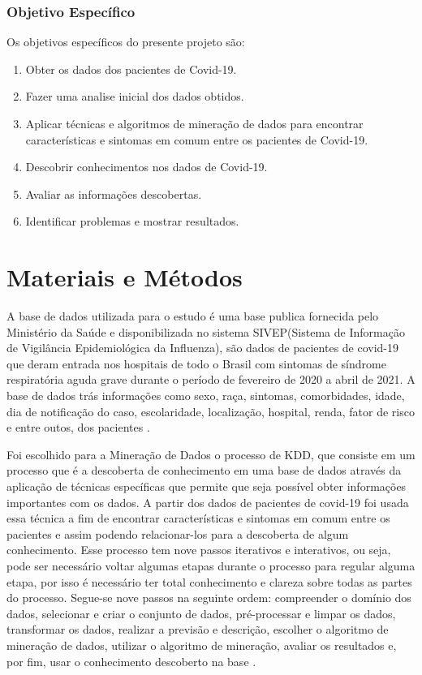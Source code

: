 \documentclass[tcc1]{uftex}
\begin{document}
\subsection*{Objetivo Específico}

Os objetivos específicos do presente projeto são: 
\begin{enumerate}
    \item Obter os dados dos pacientes de Covid-19.
	\item Fazer uma analise inicial dos dados obtidos.
	\item Aplicar técnicas e algoritmos de mineração de dados para encontrar características e sintomas em comum entre os pacientes de Covid-19.
	\item Descobrir conhecimentos nos dados de Covid-19.
	\item Avaliar as informações descobertas.
	\item Identificar problemas e mostrar resultados.
\end{enumerate}


\chapter{Materiais e Métodos}

A base de dados utilizada para o estudo é uma base publica fornecida pelo Ministério da Saúde e disponibilizada no sistema SIVEP(Sistema de Informação de Vigilância Epidemiológica da Influenza), são dados de pacientes de covid-19 que deram entrada nos hospitais de todo o Brasil com sintomas de síndrome respiratória aguda grave durante o período de fevereiro de 2020 a abril de 2021. A base de dados trás informações como sexo, raça, sintomas, comorbidades, idade, dia de notificação do caso, escolaridade, localização, hospital, renda, fator de risco e entre outos, dos pacientes \cite{gov}. 


	Foi escolhido para a Mineração de Dados o processo de KDD, que consiste em um processo que é a descoberta de conhecimento em uma base de dados através da aplicação de técnicas específicas que permite que seja possível obter informações importantes com os dados. A partir dos dados de pacientes de covid-19 foi usada essa técnica a fim de encontrar características e sintomas em comum entre os pacientes e assim podendo relacionar-los para a descoberta de algum conhecimento. Esse processo tem nove passos iterativos e interativos, ou seja, pode ser necessário voltar algumas etapas durante o processo para regular alguma etapa, por isso é necessário ter total conhecimento e clareza sobre todas as partes do processo. Segue-se nove passos na seguinte ordem: compreender o domínio dos dados, selecionar e criar o conjunto de dados, pré-processar e limpar os dados, transformar os dados, realizar a previsão e descrição, escolher o algoritmo de mineração de dados, utilizar o algoritmo de mineração, avaliar os resultados e, por fim, usar o conhecimento descoberto na base \cite{maimon}.
    
\end{document}
